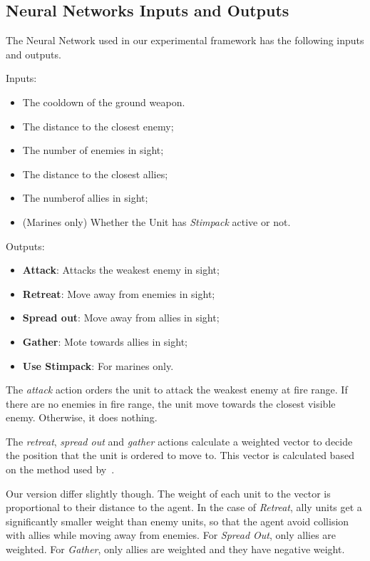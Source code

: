 \subsection{Neural Networks Inputs and Outputs}

The Neural Network used in our experimental framework has the
following inputs and outputs.

Inputs:
\begin{itemize}
    \item The cooldown of the ground weapon.
    \item The distance to the closest enemy;
    \item The number of enemies in sight;
    \item The distance to the closest allies;
    \item The numberof allies in sight;
    \item (Marines only) Whether the Unit has \emph{Stimpack} active or not.
\end{itemize}

Outputs:
\begin{itemize}
    \item {\bf Attack}: Attacks the weakest enemy in sight;
    \item {\bf Retreat}: Move away from enemies in sight;
    \item {\bf Spread out}: Move away from allies in sight;
    \item {\bf Gather}: Mote towards allies in sight;
    \item {\bf Use Stimpack}: For marines only.
\end{itemize}

The \emph{attack} action orders the unit to attack the weakest enemy
at fire range. If there are no enemies in fire range, the
unit move towards the closest visible enemy. Otherwise, it does nothing.

The \emph{retreat}, \emph{spread out} and \emph{gather} actions
calculate a weighted vector to decide the position that the unit is
ordered to move to. This vector is calculated based on the method used
by~\cite{Shantia11ConnectionistSC, Wender12ReinforcementMicroSC,
  Zhen13NeuroEvoSC}.

Our version differ slightly though. The weight of each unit to the
vector is proportional to their distance to the agent. In the case of
\emph{Retreat}, ally units get a significantly smaller weight than
enemy units, so that the agent avoid collision with allies while
moving away from enemies. For \emph{Spread Out}, only allies are
weighted. For \emph{Gather}, only allies are weighted and they have
negative weight.

